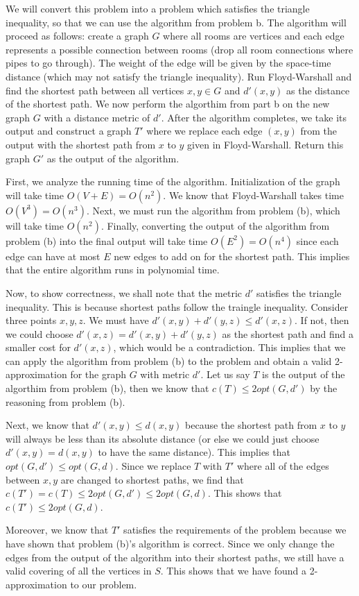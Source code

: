 \documentclass[psamsfonts]{amsart}
\newenvironment{sol}{{\bfseries Solution}}{\qedsymbol}
\theoremstyle{definition}
\theoremstyle{remark}
\numberwithin{equation}{section}
\begin{document}
\begin{sol}
We will convert this problem into a problem which satisfies the triangle inequality, so that we can use the algorithm from problem b. The algorithm will proceed as follows: create a graph $G$ where all rooms are vertices and each edge represents a possible connection between rooms (drop all room connections where pipes to go through). The weight of the edge will be given by the space-time distance (which may not satisfy the triangle inequality). Run Floyd-Warshall and find the shortest path between all vertices $x,y \in G$ and $d'(x,y)$ as the distance of the shortest path. We now perform the algorthim from part b on the new graph $G$ with a distance metric of $d'$. After the algorithm completes, we take its output and construct a graph $T'$ where we replace each edge $(x,y)$ from the output with the shortest path from $x$ to $y$ given in Floyd-Warshall. Return this graph $G'$ as the output of the algorithm.

First, we analyze the running time of the algorithm. Initialization of the graph will take time $O(V + E ) = O(n^2)$. We know that Floyd-Warshall takes time $O(V^3) = O(n^3)$. Next, we must run the algorithm from problem (b), which will take time $O(n^2)$. Finally, converting the output of the algorithm from problem (b) into the final output will take time $O(E^2) = O(n^4)$ since each edge can have at most $E$ new edges to add on for the shortest path. This implies that the entire algorithm runs in polynomial time. 

Now, to show correctness, we shall note that the metric $d'$ satisfies the triangle inequality. This is because shortest paths follow the traingle inequality. Consider three points $x,y,z$. We must have $d'(x,y) + d'(y,z) \leq d'(x,z)$. If not, then we could choose $d'(x,z) = d'(x,y) + d'(y,z)$ as the shortest path and find a smaller cost for $d'(x,z)$, which would be a contradiction. This implies that we can apply the algorithm from problem (b) to the problem and obtain a valid 2-approximation for the graph $G$ with metric $d'$. Let us say $T$ is the output of the algorthim from problem (b), then we know that $c(T) \leq 2 opt(G, d')$ by the reasoning from problem (b). 

Next, we know that $d'(x,y) \leq d(x,y)$ because the shortest path from $x$ to $y$ will always be less than its absolute distance (or else we could just choose $d'(x,y) = d(x,y)$ to have the same distance). This implies that $opt(G, d') \leq opt(G, d)$. Since we replace $T$ with $T'$ where all of the edges between $x,y$ are changed to shortest paths, we find that $c(T') = c(T) \leq 2 opt(G, d') \leq 2 opt(G, d)$. This shows that $c(T') \leq 2 opt(G,d)$. 

Moreover, we know that $T'$ satisfies the requirements of the problem because we have shown that problem (b)'s algorithm is correct. Since we only change the edges from the output of the algorithm into their shortest paths, we still have a valid covering of all the vertices in $S$. This shows that we have found a 2-approximation to our problem.
\end{sol}
\end{document}
